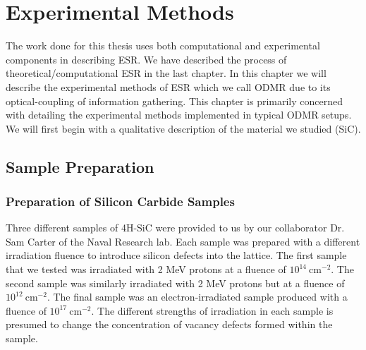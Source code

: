 \documentclass[oneside, noacknowlegments]{BYUPhys}
\begin{document}
\chapter{Experimental Methods}

The work done for this thesis uses both computational and experimental components in describing ESR. We have described the process of theoretical/computational ESR in the last chapter. In this chapter we will describe the experimental methods of ESR which we call ODMR due to its optical-coupling of information gathering. This chapter is primarily concerned with detailing the experimental methods implemented in typical ODMR setups. We will first begin with a qualitative description of the material we studied (SiC).

\section{Sample Preparation}

\subsection{Preparation of Silicon Carbide Samples}
\label{sec:SiCSamples}

Three different samples of 4H-SiC were provided to us by our collaborator Dr. Sam Carter of the Naval Research lab. Each sample was prepared with a different irradiation fluence to introduce silicon defects into the lattice. The first sample that we tested was irradiated with 2 MeV protons at a fluence of $10^{14}~\text{cm}^{-2}$. The second sample was similarly irradiated with 2 MeV protons but at a fluence of $10^{12}~\text{cm}^{-2}$. The final sample was an electron-irradiated sample produced with a fluence of $10^{17}~\text{cm}^{-2}$. The different strengths of irradiation in each sample is presumed to change the concentration of vacancy defects formed within the sample.
\end{document}
